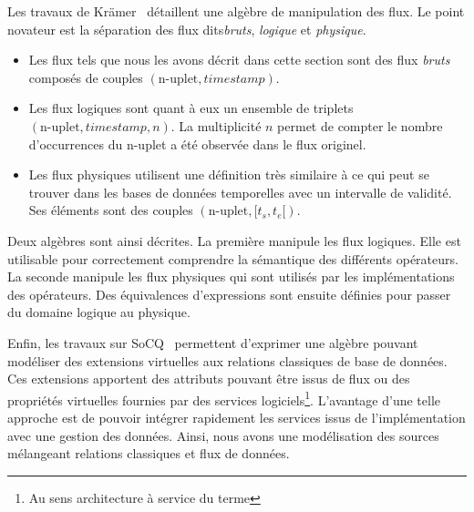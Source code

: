 Les travaux de Krämer~\cite{Kramer:semantics} détaillent une algèbre de manipulation des flux. Le point novateur est la séparation des flux dits\textit{bruts}, \textit{logique} et \textit{physique}. 
\begin{itemize}
	\item Les flux tels que nous les avons décrit dans cette section sont des flux \textit{bruts} composés de couples $(\textrm{n-uplet},\textit{timestamp})$.
	\item Les flux logiques sont quant à eux un ensemble de triplets $(\textrm{n-uplet}, \textit{timestamp}, n)$. La multiplicité $n$ permet de compter le nombre d'occurrences du n-uplet a été observée dans le flux originel.
	\item Les flux physiques utilisent une définition très similaire à ce qui peut se trouver dans les bases de données temporelles avec un intervalle de validité. Ses éléments sont des couples $(\textrm{n-uplet},[t_s, t_e[)$.
\end{itemize} 
Deux algèbres sont ainsi décrites. La première manipule les flux logiques. Elle est utilisable pour correctement comprendre la sémantique des différents opérateurs. La seconde manipule les flux physiques qui sont utilisés par les implémentations des opérateurs. Des équivalences d'expressions sont ensuite définies pour passer du domaine logique au physique.

Enfin, les travaux sur SoCQ~\cite{Gripay:algebra} permettent d'exprimer une algèbre pouvant modéliser des extensions virtuelles aux relations classiques de base de données. Ces extensions apportent des attributs pouvant être issus de flux ou des propriétés virtuelles fournies par des services logiciels\footnote{Au sens architecture à service du terme}. L'avantage d'une telle approche est de pouvoir intégrer rapidement les services issus de l'implémentation avec une gestion des données. Ainsi, nous avons une modélisation des sources mélangeant relations classiques et flux de données.
